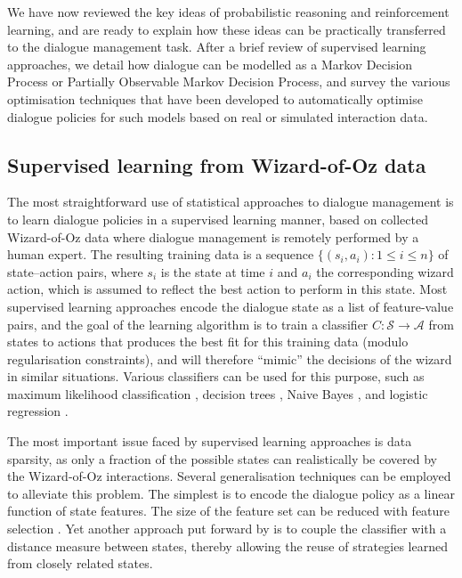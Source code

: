 We have now reviewed the key ideas of probabilistic reasoning and reinforcement learning, and are ready to explain how these ideas can be practically transferred to the dialogue management task.  After a brief review of supervised learning approaches, we detail how dialogue can be modelled as a Markov Decision Process or Partially Observable Markov Decision Process, and survey the various optimisation techniques that have been developed to automatically optimise dialogue policies for such models based on real or simulated interaction data.  

\subsection{Supervised learning from Wizard-of-Oz data}

The most straightforward use of statistical approaches to dialogue management is to learn dialogue policies in a supervised learning manner, based on collected  Wizard-of-Oz data where dialogue management is remotely performed by a human expert.  The resulting training data is a sequence $\{( s_i, a_i ) : 1 \leq i \leq n\}$ of state--action pairs, where $s_i$ is the state at time $i$ and $a_i$ the corresponding wizard action, which is assumed to reflect the best action to perform in this state.  Most supervised learning approaches encode the dialogue state as a list of feature-value pairs, and the goal of the learning algorithm is to train a classifier $C: \mathcal{S} \rightarrow \mathcal{A}$  from states to actions that produces the best fit for this training data (modulo regularisation constraints), and will therefore ``mimic'' the decisions of the wizard in similar situations. Various classifiers can be used for this purpose, such as maximum likelihood classification \citep{Hurtado:2005}, decision trees \citep{LaneKU04}, Naive Bayes \citep{williams2003}, and logistic regression \citep{rieser2006,Passonneau2012}.  

The most important issue faced by supervised learning approaches is data sparsity, as only a fraction of the possible states can realistically be covered by the Wizard-of-Oz interactions.  Several generalisation techniques can be employed to alleviate this problem.  The simplest is to encode the dialogue policy as a linear function of state features. The size of the feature set can be reduced with feature selection \citep{Passonneau2012}. Yet another approach put forward by \cite{Hurtado:2005} is to couple the classifier with a distance measure between states, thereby allowing the reuse of strategies learned from closely related states.

